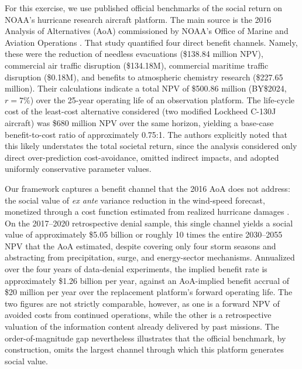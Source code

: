 \documentclass[12pt]{article}%
\begin{document}
For this exercise, we use published official benchmarks of the social return on NOAA's hurricane research aircraft platform. The main source is the 2016 Analysis of Alternatives (AoA) commissioned by NOAA's Office of Marine and Aviation Operations \citep{ANSER2016ExternalBenefits}. That study quantified four direct benefit channels. Namely, these were the reduction of needless evacuations (\$138.84 million NPV), commercial air traffic disruption (\$134.18M), commercial maritime traffic disruption (\$0.18M), and benefits to atmospheric chemistry research (\$227.65 million). Their calculations indicate a total NPV of \$500.86 million (BY\$2024, $r = 7\%$) over the 25-year operating life of an observation platform. The life-cycle cost of the least-cost alternative considered (two modified Lockheed C-130J aircraft) was \$680 million NPV over the same horizon, yielding a base-case benefit-to-cost ratio of approximately 0.75:1. The authors explicitly noted that this likely understates the total societal return, since the analysis considered only direct over-prediction cost-avoidance, omitted indirect impacts, and adopted uniformly conservative parameter values.

Our framework captures a benefit channel that the 2016 AoA does not address: the social value of \emph{ex ante} variance reduction in the wind-speed forecast, monetized through a cost function estimated from realized hurricane damages \citep{molina2024social}. On the 2017--2020 retrospective denial sample, this single channel yields a social value of approximately \$5.05 billion or roughly 10 times the entire 2030--2055 NPV that the AoA estimated, despite covering only four storm seasons and abstracting from precipitation, surge, and energy-sector mechanisms. Annualized over the four years of data-denial experiments, the implied benefit rate is approximately \$1.26 billion per year, against an AoA-implied benefit accrual of \$20 million per year over the replacement platform's forward operating life. The two figures are not strictly comparable, however, as one is a forward NPV of avoided costs from continued operations, while the other is a retrospective valuation of the information content already delivered by past missions. The order-of-magnitude gap nevertheless illustrates that the official benchmark, by construction, omits the largest channel through which this platform generates social value.
\end{document}
